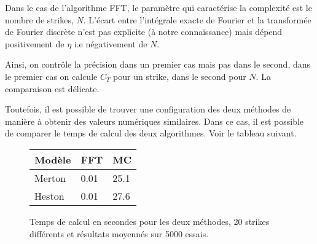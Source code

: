 \documentclass{article}
\begin{document}
Dans le cas de l'algorithme FFT, le paramètre qui caractérise la complexité est le nombre de strikes, $N$. L'écart entre l'intégrale exacte de Fourier et la transformée de Fourier discrète n'est pas explicite (à notre connaissance) mais dépend positivement de $\eta$ i.e négativement de $N$.

Ainsi, on contrôle la précision dans un premier cas mais pas dans le second, dans le premier cas on calcule $C_T$ pour un strike, dans le second pour $N$. La comparaison est délicate. 

Toutefois, il est possible de trouver une configuration des deux méthodes de manière à obtenir des valeurs numériques similaires. Dans ce cas, il est possible de comparer le temps de calcul des deux algorithmes. Voir le tableau suivant.
\begin{figure}
	\centering
\begin{tabular}{lll}
	Modèle & FFT & MC\\
	\hline
	Merton & 0.01 & 25.1\\
	Heston & 0.01 & 27.6\\
\end{tabular}
\caption{Temps de calcul en secondes pour les deux méthodes, 20 strikes différents et résultats moyennés sur 5000 essais.}
\end{figure}
\end{document}
